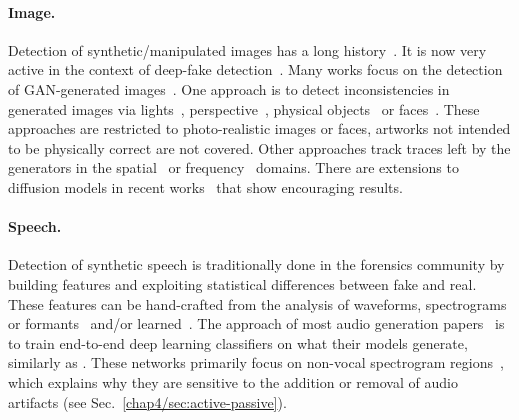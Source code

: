 \paragraph{Image.}
Detection of synthetic/manipulated images has a long history~\citep{farid2009image, barni2023information}.
It is now very active in the context of deep-fake detection~\citep{guarnera2020deepfake, zhao2021multi}. 
Many works focus on the detection of \Gls*{GAN}-generated images~\citep{chai2020makes, gragnaniello2021gan, wang2020cnn, zhang2019detecting}.
One approach is to detect inconsistencies in generated images via lights~\citep{farid2022lighting}, perspective~\citep{farid2022perspective, sarkar2024shadows}, physical objects~\citep{ma2022totems} or faces~\citep{li2018exposing, wang2019detecting, bohavcek2023geometric}.
These approaches are restricted to photo-realistic images or faces, artworks not intended to be physically correct are not covered.
Other approaches track traces left by the generators in the spatial~\citep{marra2019gans, yu2019attributing} or frequency~\citep{frank2020leveraging, zhang2019detecting} domains.
There are extensions to \glspl*{diffusion model} in recent works~\citep{corvi2022detection, sha2022fake, epstein2023online} that show encouraging results.

\paragraph{Speech.}
Detection of synthetic speech is traditionally done in the forensics community by building features and exploiting statistical differences between fake and real.
These features can be hand-crafted from the analysis of waveforms, spectrograms or formants~\citep{sahidullah2015comparison, janicki2015spoofing, albadawy2019detecting, borrelli2021synthetic, cuccovillo2024audio} and/or learned~\citep{muller2022does, barrington2023single}.
The approach of most audio generation papers~\citep{Borsos2022AudioLMAL, Kharitonov2023SpeakRA, borsos2023soundstorm, le2023voicebox} is to train end-to-end deep learning classifiers on what their models generate, similarly as \citet{zhang2017investigation, tak2021end, tak2021end2, jung2022aasist}.
These networks primarily focus on non-vocal spectrogram regions~\citep{salvi2023towards, salvi2024listening}, which explains why they are sensitive to the addition or removal of audio artifacts (see Sec.~\ref{chap4/sec:active-passive}).

